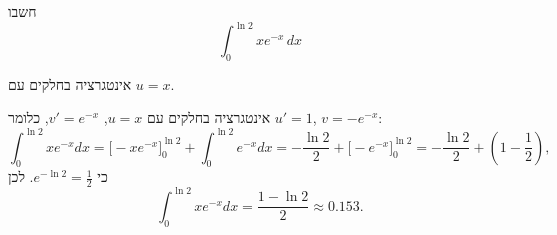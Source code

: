 
\begin{question}
חשבו
\[ \int_0^{\ln2}xe^{-x}\,dx \]
\end{question}

\begin{hint}
אינטגרציה בחלקים עם $u=x$.
\end{hint}

\begin{solution}
אינטגרציה בחלקים עם $u=x$, $v'=e^{-x}$, כלומר $u'=1$, $v=-e^{-x}$:
\[ \int_0^{\ln2}xe^{-x}dx=\Big[-xe^{-x}\Big]_0^{\ln2}+\int_0^{\ln2}e^{-x}dx=-\frac{\ln2}{2}+\Big[-e^{-x}\Big]_0^{\ln2}=-\frac{\ln2}{2}+\left(1-\frac12\right), \]
כי $e^{-\ln2}=\frac12$. לכן
\[ \int_0^{\ln2}xe^{-x}dx=\boxed{\frac{1-\ln2}{2}}\approx0.153. \]
\end{solution}

